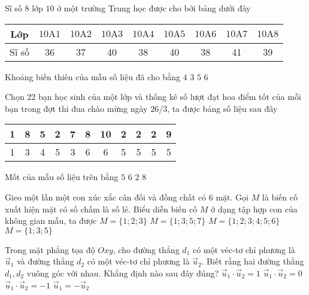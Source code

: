 \begin{ex}%
	Sĩ số $8$ lớp $10$ ở một trường Trung học được cho bởi bảng dưới đây
	\begin{center}
		\begin{tabular}{|c|c|c|c|c|c|c|c|c|}
		\hline Lớp & $10 \mathrm{A} 1$ & $10 \mathrm{A} 2$ & $10 \mathrm{A} 3$ & $10 \mathrm{A} 4$ & $10 \mathrm{A} 5$ & $10 \mathrm{A} 6$ & $10 \mathrm{A} 7$ & $10 \mathrm{A} 8$ \\
		\hline Sĩ số & 36 & 37 & 40 & 38 & 40 & 38 & 41 & 39 \\
		\hline
	\end{tabular}
	\end{center}
	Khoảng biến thiên của mẫu số liệu đã cho bằng
	\choice
	{$4$}
	{$3$}
	{\True $5$}
	{$6$}
\end{ex}
\begin{ex}%
	Chọn 22 bạn học sinh của một lớp và thống kê số lượt đạt hoa điểm tốt của mỗi bạn trong đợt thi đua chào mừng ngày $26 / 3$, ta được bảng số liệu sau đây
	\begin{center}
		\begin{tabular}{|c|c|c|c|c|c|c|c|c|c|c|}
		\hline 1 & 8 & 5 & 2 & 7 & 8 & 10 & 2 & 2 & 2 & 9 \\
		\hline 1 & 3 & 4 & 5 & 3 & 6 & 6 & 5 & 5 & 5 & 5 \\
		\hline
	\end{tabular}
	\end{center}
	Mốt của mẫu số liệu trên bằng
	\choice
	{\True $5$}
	{$6$}
	{$2$}
	{$8$}
\end{ex}
\begin{ex}%
	Gieo một lần một con xúc xắc cân đối và đồng chất có $6$ mặt. Gọi $M$ là biến cố xuất hiện mặt có số chấm là số lẻ. Biểu diễn biến cố $M$ ở dạng tập hợp con của không gian mẫu, ta được
	\choice
	{$M=\{1;2;3\}$}
	{$M=\{1;3;5;7\}$}
	{$M=\{1;2;3;4;5;6\}$}
	{\True $M=\{1;3;5\}$}
\end{ex}
\begin{ex}%
	Trong mặt phẳng tọa độ $O x y$, cho đường thẳng $d_1$ có một véc-tơ chỉ phương là $\vec{u}_1$ và đường thẳng $d_2$ có một véc-tơ chỉ phương là $\vec{u}_2$. Biết rằng hai đường thẳng $d_1, d_2$ vuông góc với nhau. Khẳng định nào sau đây đúng?
	\choice
	{$\vec{u}_1 \cdot \vec{u}_2=1$}
	{\True $\vec{u}_1 \cdot \vec{u}_2=0$}
	{$\vec{u}_1 \cdot \vec{u}_2=-1$}
	{$\vec{u}_1=-\vec{u}_2$}
\end{ex}
